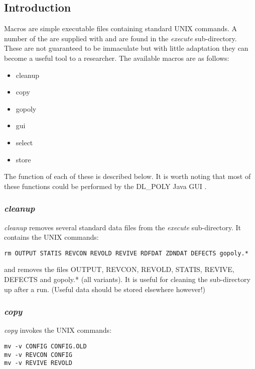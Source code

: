 \label{macros}
\subsection*{Introduction}

Macros are simple executable files containing standard UNIX
commands.  A number of the are supplied with \D and are found in
the {\em execute} sub-directory.  These are
not guaranteed to be immaculate but with little adaptation they
can become a useful tool to a researcher.  The available macros
are as follows:

{\sl
\begin{itemize}
\item cleanup
\item copy
\item gopoly
\item gui
\item select
\item store
\end{itemize}
}

\noindent The function of each of these is described below.  It is
worth noting that most of these functions could be performed by the
DL\_POLY Java GUI \cite{smith-gui}.

\subsubsection*{{\sl cleanup}}

{\sl cleanup} removes several standard data files from the {\em
execute} sub-directory.  It contains the UNIX
commands:
\begin{verbatim}
rm OUTPUT STATIS REVCON REVOLD REVIVE RDFDAT ZDNDAT DEFECTS gopoly.*
\end{verbatim}
\noindent and removes the files OUTPUT, REVCON, REVOLD, STATIS,
REVIVE, DEFECTS and gopoly.* (all variants).  It is useful for
cleaning the sub-directory up after a run.
(Useful data should be stored elsewhere however!)

\subsubsection*{{\sl copy}}

{\sl copy} invokes the UNIX commands:

\begin{verbatim}
mv -v CONFIG CONFIG.OLD
mv -v REVCON CONFIG
mv -v REVIVE REVOLD
\end{verbatim}


